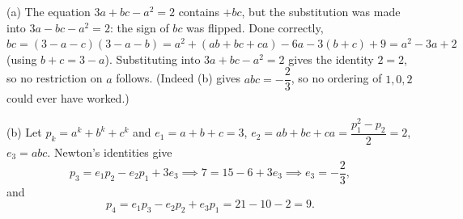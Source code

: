 (a) The equation \(3a+bc-a^2=2\) contains \(+bc\), but the substitution was made into \(3a-bc-a^2=2\): the sign of \(bc\) was flipped. Done correctly, \(bc=(3-a-c)(3-a-b)=a^2+(ab+bc+ca)-6a-3(b+c)+9=a^2-3a+2\) (using \(b+c=3-a\)). Substituting into \(3a+bc-a^2=2\) gives the identity \(2=2\), so no restriction on \(a\) follows. (Indeed (b) gives \(abc=-\dfrac{2}{3}\), so no ordering of \(1,0,2\) could ever have worked.)

(b) Let \(p_k=a^k+b^k+c^k\) and \(e_1=a+b+c=3\), \(e_2=ab+bc+ca=\dfrac{p_1^2-p_2}{2}=2\), \(e_3=abc\). Newton's identities give
\[
p_3=e_1p_2-e_2p_1+3e_3\implies 7=15-6+3e_3\implies e_3=-\dfrac{2}{3},
\]
and
\[
p_4=e_1p_3-e_2p_2+e_3p_1=21-10-2=\boxed{9}.
\]
